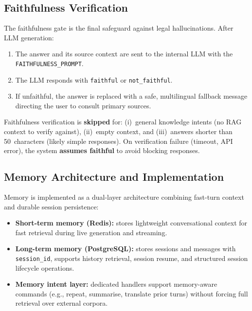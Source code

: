 \documentclass[12pt, a4paper]{article}
\begin{document}
\subsection{Faithfulness Verification}
\label{sec:faithfulness}

The faithfulness gate is the final safeguard against legal hallucinations.
After LLM generation:

\begin{enumerate}[leftmargin=2em]
  \item The answer and its source context are sent to the internal LLM
        with the \texttt{FAITHFULNESS\_PROMPT}.
  \item The LLM responds with \texttt{faithful} or \texttt{not\_faithful}.
  \item If unfaithful, the answer is replaced with a safe, multilingual
        fallback message directing the user to consult primary sources.
\end{enumerate}

\begin{warningbox}
Faithfulness verification is \textbf{skipped} for: (i)~general knowledge
intents (no RAG context to verify against), (ii)~empty context, and
(iii)~answers shorter than 50~characters (likely simple responses).
On verification failure (timeout, API error), the system \textbf{assumes
faithful} to avoid blocking responses.
\end{warningbox}

\subsection{Memory Architecture and Implementation}

Memory is implemented as a dual-layer architecture combining fast-turn
context and durable session persistence:

\begin{itemize}[leftmargin=2em]
  \item \textbf{Short-term memory (Redis):} stores lightweight conversational
        context for fast retrieval during live generation and streaming.
  \item \textbf{Long-term memory (PostgreSQL):} stores sessions and messages
        with \texttt{session\_id}, supports history retrieval, session resume,
        and structured session lifecycle operations.
  \item \textbf{Memory intent layer:} dedicated handlers support memory-aware
        commands (e.g., repeat, summarise, translate prior turns) without
        forcing full retrieval over external corpora.
\end{itemize}
\end{document}
